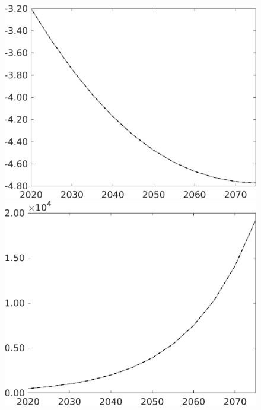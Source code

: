 \documentclass[12pt]{article}
\begin{document}
\begin{figure}[h!!]
\begin{minipage}[]{0.32\textwidth}
\end{minipage}	
\begin{minipage}[]{0.32\textwidth}
\includegraphics[width=1\textwidth]{../../codding_model/own_basedOnFried/optimalPol_010922_revision/figures/all_13Sept22/PerdifNoTauf_Equlab_regime0_CompTaul_EY_spillover0_nsk1_xgr0_knspil1_sep1_LFlimit0_emsbase0_countec0_GovRev0_etaa0.79_lgd0.png}
\end{minipage}	
\begin{minipage}[]{0.32\textwidth}
\includegraphics[width=1\textwidth]{../../codding_model/own_basedOnFried/optimalPol_010922_revision/figures/all_13Sept22/PerdifNoTauf_Equlab_regime0_CompTaul_GFF_spillover0_nsk1_xgr0_knspil1_sep1_LFlimit0_emsbase0_countec0_GovRev0_etaa0.79_lgd0.png}
\end{minipage}	
\end{figure}
\end{document}
